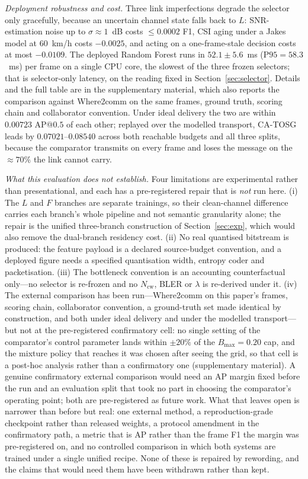 \documentclass[journal]{IEEEtran}
\newcommand{\method}{CA-TOSG}
\begin{document}
\emph{Deployment robustness and cost.} Three link imperfections degrade the selector only gracefully,
because an uncertain channel state falls back to $L$: SNR-estimation noise up to $\sigma\approx1$~dB
costs $\le0.0002$ F1, CSI aging under a Jakes model at $60$~km/h costs $-0.0025$, and acting on a
one-frame-stale decision costs at most $-0.0109$. The deployed Random Forest runs in
$52.1 \pm 5.6$~ms ($\mathrm{P95}=58.3$~ms) per frame on a single CPU core, the slowest of the three
frozen selectors; that is selector-only latency, on the reading fixed in Section~\ref{sec:selector}. Details and the full
table are in the supplementary material, which also reports the comparison against
Where2comm on the same frames, ground truth, scoring chain and collaborator convention. Under ideal
delivery the two are within $0.00723$ AP@$0.5$ of each other; replayed over the modelled transport,
\method{} leads by $0.07021$--$0.08540$ across both reachable budgets and all three splits, because the
comparator transmits on every frame and loses the message on the ${\approx}70\%$ the link cannot
carry.

\emph{What this evaluation does not establish.} Four limitations are experimental rather than
presentational, and each has a pre-registered repair that is \emph{not} run here. (i) The $L$ and $F$
branches are separate trainings, so their clean-channel difference carries each branch's whole
pipeline and not semantic granularity alone; the repair is the unified three-branch construction of
Section~\ref{sec:exp}, which would also remove the dual-branch residency cost. (ii) No real
quantised bitstream is produced: the feature payload is a declared source-budget convention, and a
deployed figure needs a specified quantisation width, entropy coder and packetisation. (iii) The
bottleneck convention is an accounting counterfactual only---no selector is re-frozen and no
$N_{\mathrm{cw}}$, BLER or $\lambda$ is re-derived under it. (iv) The external comparison has been run---Where2comm on this paper's frames, scoring chain, collaborator convention, a ground-truth set made identical by construction, and both under ideal delivery and under the modelled transport---but not at the pre-registered confirmatory cell: no single setting of the comparator's control parameter lands within $\pm20\%$ of the $B_{\max}=0.20$ cap, and the mixture policy that reaches it was chosen after seeing the grid, so that cell is a post-hoc analysis rather than a confirmatory one (supplementary material). A genuine confirmatory external comparison would need an AP margin fixed before the run and an evaluation split that took no part in choosing the comparator's operating point; both are pre-registered as future work. What that leaves open is narrower than before but real: one external method, a reproduction-grade checkpoint rather than released weights, a protocol amendment in the confirmatory path, a metric that is AP rather than the frame F1 the margin was pre-registered on, and no controlled comparison in which both systems are trained under a single unified recipe. None of these is repaired by rewording,
and the claims that would need them have been withdrawn rather than kept.
\end{document}
